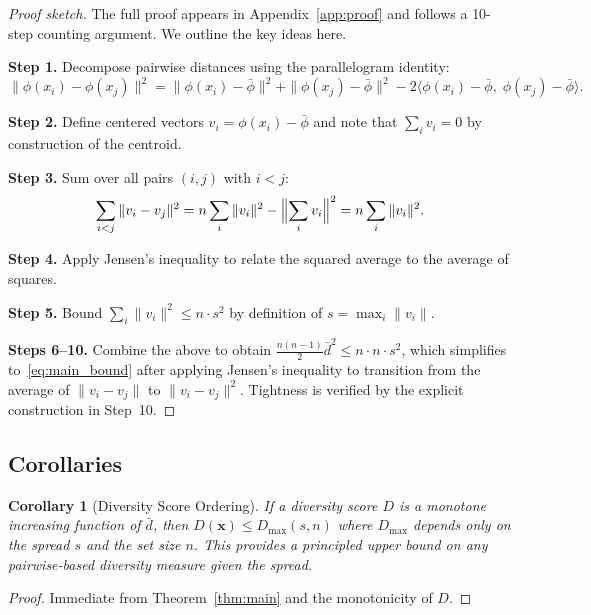 \documentclass[11pt,a4paper]{article}
\newtheorem{corollary}[theorem]{Corollary}
\begin{document}
\begin{proof}[Proof sketch]
The full proof appears in Appendix~\ref{app:proof} and follows
a 10-step counting argument.  We outline the key ideas here.

\textbf{Step 1.} Decompose pairwise distances using the
parallelogram identity:
\begin{equation}\label{eq:parallel}
  \|\phi(x_i) - \phi(x_j)\|^2 =
  \|\phi(x_i) - \bar{\phi}\|^2 +
  \|\phi(x_j) - \bar{\phi}\|^2 -
  2\langle \phi(x_i) - \bar{\phi},\;
           \phi(x_j) - \bar{\phi} \rangle.
\end{equation}

\textbf{Step 2.} Define centered vectors
$v_i = \phi(x_i) - \bar{\phi}$ and note that
$\sum_i v_i = 0$ by construction of the centroid.

\textbf{Step 3.} Sum over all pairs $(i,j)$ with $i < j$:
\begin{equation}
  \sum_{i < j} \|v_i - v_j\|^2
  = n \sum_i \|v_i\|^2 - \Bigl\|\sum_i v_i\Bigr\|^2
  = n \sum_i \|v_i\|^2.
\end{equation}

\textbf{Step 4.} Apply Jensen's inequality to relate the
squared average to the average of squares.

\textbf{Step 5.} Bound $\sum_i \|v_i\|^2 \leq n \cdot s^2$
by definition of $s = \max_i \|v_i\|$.

\textbf{Steps 6--10.} Combine the above to obtain
$\frac{n(n-1)}{2} \bar{d}^2 \leq n \cdot n \cdot s^2$,
which simplifies to~\eqref{eq:main_bound} after applying
Jensen's inequality to transition from the average of
$\|v_i - v_j\|$ to $\|v_i - v_j\|^2$.
Tightness is verified by the explicit construction in
Step~10.
\end{proof}

\subsection{Corollaries}

\begin{corollary}[Diversity Score Ordering]\label{cor:ordering}
If a diversity score $D$ is a monotone increasing function of
$\bar{d}$, then $D(\mathbf{x}) \leq D_{\max}(s, n)$ where
$D_{\max}$ depends only on the spread $s$ and the set size $n$.
This provides a principled upper bound on any pairwise-based
diversity measure given the spread.
\end{corollary}

\begin{proof}
Immediate from Theorem~\ref{thm:main} and the monotonicity of $D$.
\end{proof}
\end{document}
